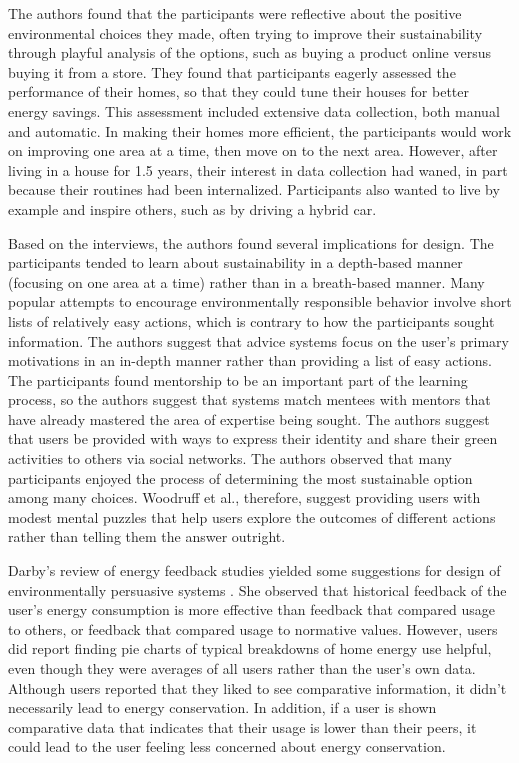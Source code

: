 The authors found that the participants were reflective about the positive environmental choices they made, often trying to improve their sustainability through playful analysis of the options, such as buying a product online versus buying it from a store. They found that participants eagerly assessed the performance of their homes, so that they could tune their houses for better energy savings. This assessment included extensive data collection, both manual and automatic. In making their homes more efficient, the participants would work on improving one area at a time, then move on to the next area. However, after living in a house for 1.5 years, their interest in data collection had waned, in part because their routines had been internalized. Participants also wanted to live by example and inspire others, such as by driving a hybrid car.

Based on the interviews, the authors found several implications for design. The participants tended to learn about sustainability in a depth-based manner (focusing on one area at a time) rather than in a breath-based manner. Many popular attempts to encourage environmentally responsible behavior involve short lists of relatively easy actions, which is contrary to how the participants sought information. The authors suggest that advice systems focus on the user's primary motivations in an in-depth manner rather than providing a list of easy actions. The participants found mentorship to be an important part of the learning process, so the authors suggest that systems match mentees with mentors that have already mastered the area of expertise being sought. The authors suggest that users be provided with ways to express their identity and share their green activities to others via social networks. The authors observed that many participants enjoyed the process of determining the most sustainable option among many choices. Woodruff et al., therefore, suggest providing users with modest mental puzzles that help users explore the outcomes of different actions rather than telling them the answer outright.

Darby's review of energy feedback studies yielded some suggestions for design of environmentally persuasive systems \cite{darby-review-2006}. She observed that historical feedback of the user's energy consumption is more effective than feedback that compared usage to others, or feedback that compared usage to normative values. However, users did report finding pie charts of typical breakdowns of home energy use helpful, even though they were averages of all users rather than the user's own data. Although users reported that they liked to see comparative information, it didn't necessarily lead to energy conservation. In addition, if a user is shown comparative data that indicates that their usage is lower than their peers, it could lead to the user feeling less concerned about energy conservation.

